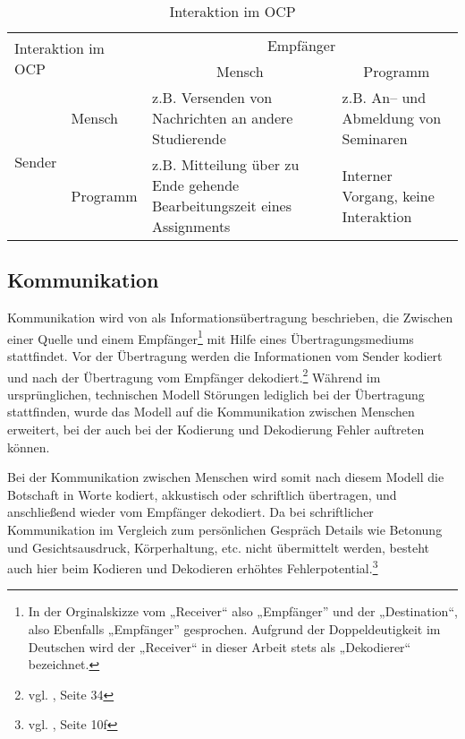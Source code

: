 \begin{table}[h]
\begin{tabular}{|l|l|m{4cm}|m{4cm}|}
\hline 
\multicolumn{2}{|l|}{\multirow{2}{*}{Interaktion im OCP}}                  & \multicolumn{2}{c|}{Empfänger}                                                                                 \\ \cline{3-4} 
\multicolumn{2}{|l|}{}                                   & \multicolumn{1}{c|}{Mensch}                                             & \multicolumn{1}{c|}{Programm}        \\ \hline
\multicolumn{1}{|c|}{\multirow{2}{*}{Sender}} & Mensch   & z.B. Versenden von Nachrichten an andere Studierende                    & z.B. An– und Abmeldung von Seminaren \\ \cline{2-4} 
\multicolumn{1}{|c|}{}                        & Programm & z.B. Mitteilung über zu Ende gehende Bearbeitungszeit eines Assignments & Interner Vorgang, keine Interaktion  \\ \hline
\end{tabular}
\caption{Interaktion im OCP}
\label{tab:ocpinteractive}
\end{table}


\subsection{Kommunikation} %
\label{sub:kommunikation}
Kommunikation wird von \cite{shannonweaver} als Informationsübertragung beschrieben, die Zwischen einer Quelle  und einem Empfänger\footnote{In der Orginalskizze vom „Receiver“ also „Empfänger” und der „Destination“, also Ebenfalls „Empfänger” gesprochen. Aufgrund der Doppeldeutigkeit im Deutschen wird der „Receiver“ in dieser Arbeit stets als „Dekodierer“ bezeichnet.} mit Hilfe eines Übertragungsmediums stattfindet. Vor der Übertragung werden die Informationen vom Sender kodiert und nach der Übertragung vom Empfänger dekodiert.\footnote{vgl. \cite{shannonweaver}, Seite 34} Während im ursprünglichen, technischen Modell Störungen lediglich bei der Übertragung stattfinden, wurde das Modell auf die Kommunikation zwischen Menschen erweitert, bei der auch bei der Kodierung und Dekodierung Fehler auftreten können.

Bei der Kommunikation zwischen Menschen wird somit nach diesem Modell die Botschaft in Worte kodiert, akkustisch oder schriftlich übertragen, und anschließend wieder vom Empfänger dekodiert. Da bei schriftlicher Kommunikation im Vergleich zum persönlichen Gespräch Details wie Betonung und Gesichtsausdruck, Körperhaltung, etc. nicht übermittelt werden, besteht auch hier beim Kodieren und Dekodieren erhöhtes Fehlerpotential.\footnote{vgl. \cite{rothe}, Seite 10f}


